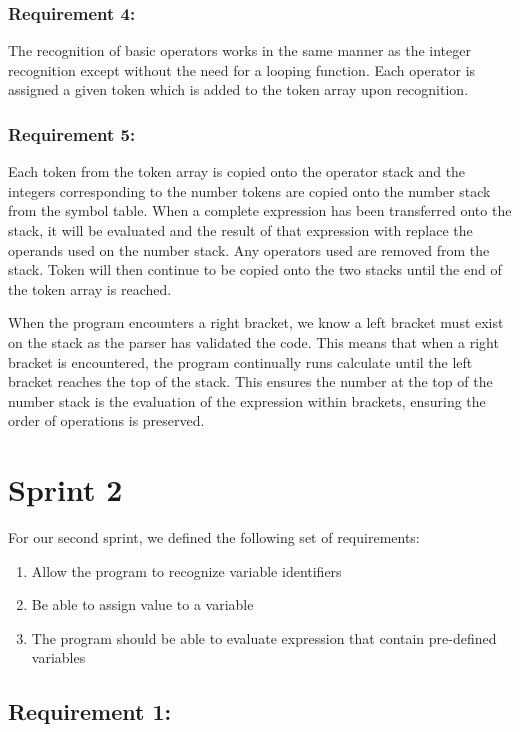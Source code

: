 \documentclass[a4paper, oneside, 11pt]{report}
\begin{document}
\subsubsection{Requirement 4:}

The recognition of basic operators works in the same manner as the integer recognition except without the need for a looping function. Each operator is assigned a given token which is added to the token array upon recognition. 

\subsubsection{Requirement 5:}

Each token from the token array is copied onto the operator stack and the integers corresponding to the number tokens are copied onto the number stack from the symbol table. When a complete expression has been transferred onto the stack, it will be evaluated and the result of that expression with replace the operands used on the number stack. Any operators used are removed from the stack. Token will then continue to be copied onto the two stacks until the end of the token array is reached.  

When the program encounters a right bracket, we know a left bracket must exist on the stack as the parser has validated the code. This means that when a right bracket is encountered, the program continually runs calculate until the left bracket reaches the top of the stack. This ensures the number at the top of the number stack is the evaluation of the expression within brackets, ensuring the order of operations is preserved. 

\section{Sprint 2}

For our second sprint, we defined the following set of requirements: 

\begin{enumerate}
\item Allow the program to recognize variable identifiers
\item Be able to assign value to a variable
\item The program should be able to evaluate expression that contain pre-defined variables
\end{enumerate}

\subsection{Requirement 1:}
\end{document}
